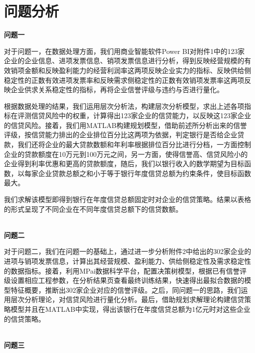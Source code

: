 \ifx\allfiles\undefined


\else
\fi


\part{问题分析}
\noindent \textbf{{\large 问题一}}


对于问题一，在数据处理方面，我们用商业智能软件Power BI对附件1中的123家企业的企业信息、进项发票信息、销项发票信息进行分析，得到反映经营规模的有效销项金额和反映盈利能力的经营利润率这两项反映企业实力的指标、反映供给侧稳定性的正数有效进项发票率和反映需求侧稳定性的正数有效销项发票率这两项反映企业供求关系稳定性的指标，再将企业信誉评级与违约与否进行量化。

根据数据处理的结果，我们运用层次分析法，构建层次分析模型，求出上述各项指标在评测信贷风险中的权重，计算得出123家企业的信贷能力，以反映这123家企业的信贷风险。接着，我们用MATLAB构建规划模型，借助前述所分析出来的信誉评级，按信贷能力排出的企业排位百分比这两项为依据，判定银行是否给企业贷款，我们还将企业的最大贷款数额和年利率根据排位百分比进行分档，一方面控制企业的贷款额度在10万元到100万元之间，另一方面，使得信誉高、信贷风险小的企业得到利率优惠和更高的贷款额度，随后，我们以银行收入的数学期望为目标函数，以每家企业贷款总额之和小于等于银行年度信贷总额为约束条件，使目标函数最大。

我们求解该模型即得到银行在年度信贷总额固定时对企业的信贷策略。结果以表格的形式呈现了不同企业在不同年度信贷总额下的信贷数额。


~\\

\noindent \textbf{{\large 问题二}}

对于问题二，我们在问题一的基础上，通过进一步分析附件2中给出的302家企业的进项与销项发票信息，计算出其经营规模、盈利能力、供给侧稳定性及需求稳定性的数据指标。接着，利用MPai数据科学平台，配置决策树模型，根据已有信誉评级设置相应工程参数，在分析结果页查看最终训练结果，快速得出最拟合数据的模型特征概要，推断出302家企业对应的信誉评级。之后，同问题一的思路，我们运用层次分析理论，对信贷风险进行量化分析。最后，借助规划求解理论构建信贷策略模型并且在MATLAB中实现，得出该银行在年度信贷总额为1亿元时对这些企业的信贷策略。


~\\

\noindent \textbf{{\large 问题三}}

